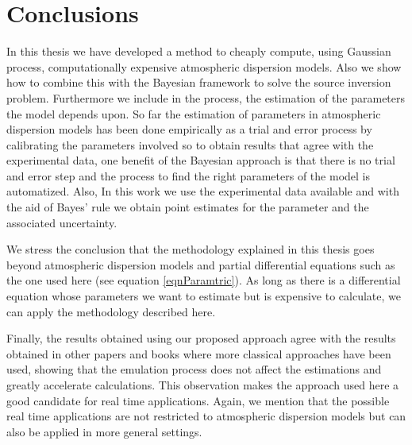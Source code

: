 \documentclass{sfuthesis}
\begin{document}
\chapter{Conclusions}



In this thesis we have developed a method to cheaply compute,  using Gaussian process,
computationally expensive atmospheric dispersion models. Also we show how to combine
this with the Bayesian framework to solve the source inversion problem. Furthermore
we include in the process,  the estimation of the parameters the model depends upon.
So far the estimation of parameters in atmospheric dispersion models has been
done empirically as a trial and error process by calibrating the parameters involved
so to obtain results that agree with the experimental data, one benefit of the 
Bayesian approach is that there is no trial and error step and the process to 
find the right parameters of the model is automatized. Also, In this work we use
the experimental data available and with the aid of 
Bayes' rule we obtain point estimates for the parameter and the associated uncertainty.

We stress  the conclusion that the methodology explained in this thesis goes beyond atmospheric dispersion models
and partial differential equations such as the one used here (see equation \eqref{eqnParamtric}). 
As long as there is a differential equation
whose parameters we want to estimate but is expensive to calculate, we can apply the methodology
described here.

Finally, the results obtained using our proposed approach agree with the results obtained in other papers and books where
more classical approaches have been used, showing that the emulation process does not affect the estimations
and greatly accelerate calculations. This observation makes the approach used here a good candidate for real
time applications. Again, we mention that the possible real time applications are not restricted to atmospheric 
dispersion models but can also be applied in more general settings.




%
%
%
%
%

\backmatter%
	
	

\end{document}
